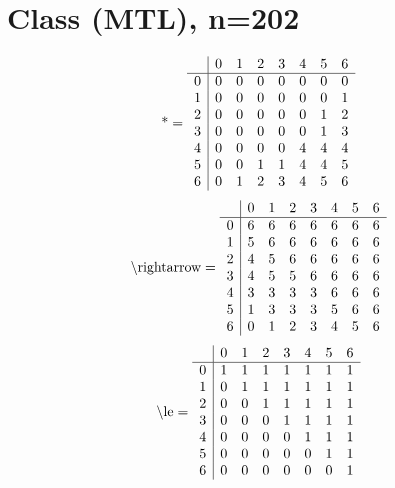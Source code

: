 \documentclass[11pt]{article}
\begin{document}
\section{Class (MTL), n=202}
\[\text{*} = 
\begin{array}{r | r r r r r r r}
 & 0 & 1 & 2 & 3 & 4 & 5 & 6 \\ \hline
0 & 0 & 0 & 0 & 0 & 0 & 0 & 0 \\
1 & 0 & 0 & 0 & 0 & 0 & 0 & 1 \\
2 & 0 & 0 & 0 & 0 & 0 & 1 & 2 \\
3 & 0 & 0 & 0 & 0 & 0 & 1 & 3 \\
4 & 0 & 0 & 0 & 0 & 4 & 4 & 4 \\
5 & 0 & 0 & 1 & 1 & 4 & 4 & 5 \\
6 & 0 & 1 & 2 & 3 & 4 & 5 & 6 \\
\end{array}
\]
\[\text{\textbackslash rightarrow} = 
\begin{array}{r | r r r r r r r}
 & 0 & 1 & 2 & 3 & 4 & 5 & 6 \\ \hline
0 & 6 & 6 & 6 & 6 & 6 & 6 & 6 \\
1 & 5 & 6 & 6 & 6 & 6 & 6 & 6 \\
2 & 4 & 5 & 6 & 6 & 6 & 6 & 6 \\
3 & 4 & 5 & 5 & 6 & 6 & 6 & 6 \\
4 & 3 & 3 & 3 & 3 & 6 & 6 & 6 \\
5 & 1 & 3 & 3 & 3 & 5 & 6 & 6 \\
6 & 0 & 1 & 2 & 3 & 4 & 5 & 6 \\
\end{array}
\]
\[\text{\textbackslash le} = 
\begin{array}{r | r r r r r r r}
 & 0 & 1 & 2 & 3 & 4 & 5 & 6 \\ \hline
0 & 1 & 1 & 1 & 1 & 1 & 1 & 1 \\
1 & 0 & 1 & 1 & 1 & 1 & 1 & 1 \\
2 & 0 & 0 & 1 & 1 & 1 & 1 & 1 \\
3 & 0 & 0 & 0 & 1 & 1 & 1 & 1 \\
4 & 0 & 0 & 0 & 0 & 1 & 1 & 1 \\
5 & 0 & 0 & 0 & 0 & 0 & 1 & 1 \\
6 & 0 & 0 & 0 & 0 & 0 & 0 & 1 \\
\end{array}
\]
\end{document}
